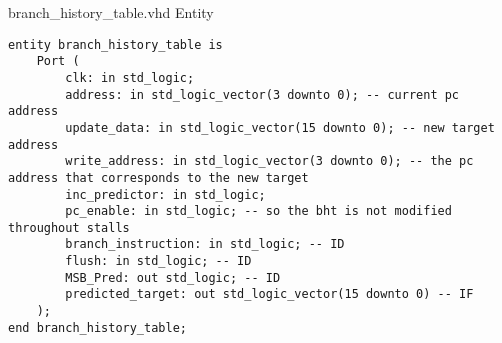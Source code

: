 \documentclass[a4paper,12pt]{report}
\begin{document}
\begin{my-listing}{ branch\_history\_table.vhd Entity}
    \begin{lstlisting}[style=vhdl]
entity branch_history_table is
    Port ( 
        clk: in std_logic; 
        address: in std_logic_vector(3 downto 0); -- current pc address
        update_data: in std_logic_vector(15 downto 0); -- new target address
        write_address: in std_logic_vector(3 downto 0); -- the pc address that corresponds to the new target
        inc_predictor: in std_logic;
        pc_enable: in std_logic; -- so the bht is not modified throughout stalls
        branch_instruction: in std_logic; -- ID
        flush: in std_logic; -- ID
        MSB_Pred: out std_logic; -- ID
        predicted_target: out std_logic_vector(15 downto 0) -- IF
    );
end branch_history_table;
    \end{lstlisting}
\end{my-listing}
\end{document}

